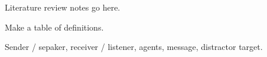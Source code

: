Literature review notes go here.

Make a table of definitions.

Sender / sepaker, receiver / listener, agents, message, distractor target. 
